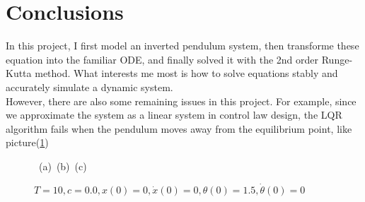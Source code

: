 \documentclass[a4paper,11pt]{article}
\begin{document}
\section{Conclusions}
In this project, I first model an inverted pendulum system, then transforme these equation into the familiar ODE, and finally solved it with the 2nd order Runge-Kutta method.
What interests me most is how to solve equations stably and accurately simulate a dynamic system.
\\
However, there are also some remaining issues in this project. For example, since we approximate the system as a linear system in control law design, 
the LQR algorithm fails when the pendulum moves away from the equilibrium point, like picture(\ref{Figure:example5})~
\begin{figure}[!hbt]
	\centering
	\mbox{
	(a)
	(b)
	(c)
	}
	\vspace{15pt}
	\caption{$T=10, c=0.0, x(0) = 0, \dot{x}(0) = 0,\theta(0)=1.5, \dot{\theta}(0)=0$}
	\label{Figure:example5}
\end{figure}




\end{document}
